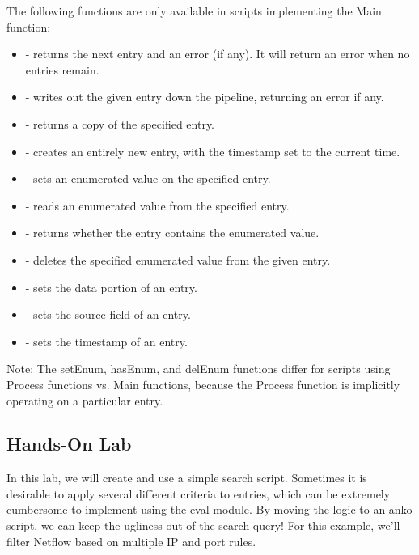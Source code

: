 The following functions are only available in scripts implementing the
Main function:

\begin{itemize}
\tightlist
\item
   - returns the next entry and an error
  (if any). It will return an error when no entries remain.
\item
   - writes out the given entry down the
  pipeline, returning an error if any.
\item
   - returns a copy of the specified entry.
\item
   - creates an entirely new entry, with the timestamp set to the current time.
\item
   - sets an enumerated value on the
  specified entry.
\item
   - reads an enumerated value
  from the specified entry.
\item
   - returns whether the entry contains
  the enumerated value.
\item
   - deletes the specified enumerated value
  from the given entry.
\item
   - sets the data portion of an entry.
\item
   - sets the source field of an entry.
\item
   - sets the timestamp of an entry.
\end{itemize}

Note: The setEnum, hasEnum, and delEnum functions differ
for scripts using Process functions vs. Main functions, because
the Process function is implicitly operating on a particular entry.

\subsection{Hands-On Lab}

In this lab, we will create and use a simple search script. Sometimes
it is desirable to apply several different criteria to entries, which
can be extremely cumbersome to implement using the eval module. By
moving the logic to an anko script, we can keep the ugliness out of the
search query! For this example, we'll filter Netflow based on multiple
IP and port rules.


